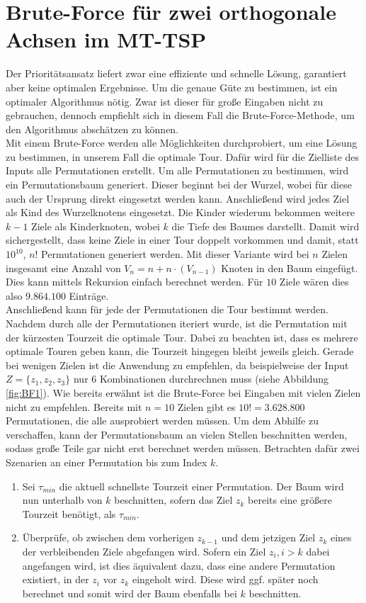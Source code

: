 \documentclass[german,version-2019-11]{uzl-thesis}
\begin{document}
\section{Brute-Force für zwei orthogonale Achsen im MT-TSP}

Der Prioritätsansatz liefert zwar eine effiziente und schnelle Lösung, garantiert aber keine optimalen Ergebnisse. Um die genaue Güte zu bestimmen, ist ein optimaler Algorithmus nötig. Zwar ist dieser für große Eingaben nicht zu gebrauchen, dennoch empfiehlt sich in diesem Fall die Brute-Force-Methode, um den Algorithmus abschätzen zu können. \\
Mit einem Brute-Force werden alle Möglichkeiten durchprobiert, um eine Lösung zu bestimmen, in unserem Fall die optimale Tour. Dafür wird für die Zielliste des Inputs alle Permutationen erstellt. Um alle Permutationen zu bestimmen, wird ein Permutationsbaum generiert. Dieser beginnt bei der Wurzel, wobei für diese auch der Ursprung direkt eingesetzt werden kann. Anschließend wird jedes Ziel als Kind des Wurzelknotens eingesetzt. Die Kinder wiederum bekommen weitere $k-1$ Ziele als Kinderknoten, wobei $k$ die Tiefe des Baumes darstellt. Damit wird sichergestellt, dass keine Ziele in einer Tour doppelt vorkommen und damit, statt $10^{10}$, $n!$ Permutationen generiert werden. Mit dieser Variante wird bei $n$ Zielen insgesamt eine Anzahl von $V_n = n + n\cdot (V_{n-1})$ Knoten in den Baum eingefügt. Dies kann mittels Rekursion einfach berechnet werden. Für $10$ Ziele wären dies also $9.864.100$ Einträge.\\
Anschließend kann für jede der Permutationen die Tour bestimmt werden. Nachdem durch alle der Permutationen iteriert wurde, ist die Permutation mit der kürzesten Tourzeit die optimale Tour. Dabei zu beachten ist, dass es mehrere optimale Touren geben kann, die Tourzeit hingegen bleibt jeweils gleich. Gerade bei wenigen Zielen ist die Anwendung zu empfehlen, da beispielweise der Input $Z=\{z_1, z_2, z_3\}$ nur 6 Kombinationen durchrechnen muss (siehe Abbildung \ref{fig:BF1}). Wie bereits erwähnt ist die Brute-Force bei Eingaben mit vielen Zielen nicht zu empfehlen. Bereits mit $n=10$ Zielen gibt es $10! = 3.628.800$ Permutationen, die alle ausprobiert werden müssen. Um dem Abhilfe zu verschaffen, kann der Permutationsbaum an vielen Stellen beschnitten werden, sodass große Teile gar nicht erst berechnet werden müssen. Betrachten dafür zwei Szenarien an einer Permutation bis zum Index $k$.
\begin{enumerate}
\item
Sei $\tau_{min}$ die aktuell schnellste Tourzeit einer Permutation. Der Baum wird nun unterhalb von $k$ beschnitten, sofern das Ziel $z_k$ bereits eine größere Tourzeit benötigt, als $\tau_{min}$. 

\item
Überprüfe, ob zwischen dem vorherigen $z_{k-1}$ und dem jetzigen Ziel $z_{k}$ eines der verbleibenden Ziele abgefangen wird. Sofern ein Ziel $z_{i}, i>k$ dabei angefangen wird, ist dies äquivalent dazu, dass eine andere Permutation existiert, in der $z_i$ vor $z_k$ eingeholt wird. Diese wird ggf. später noch berechnet und somit wird der Baum ebenfalls bei $k$ beschnitten.
\end{enumerate} 
\end{document}
